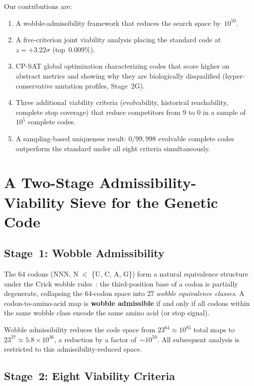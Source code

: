 \documentclass[10pt,twocolumn]{article}
\begin{document}
Our contributions are:
\begin{enumerate}[leftmargin=1.2em,itemsep=0pt]
\item A wobble-admissibility framework that reduces the search space by~$10^{50}$.
\item A five-criterion joint viability analysis placing the standard code at
      $z = +3.22\sigma$ (top~0.009\%).
\item CP-SAT global optimization characterizing codes that score higher on
      abstract metrics and showing why they are biologically disqualified
      (hyper-conservative mutation profiles, Stage~2G).
\item Three additional viability criteria (evolvability, historical
      reachability, complete stop coverage) that reduce competitors from 9 to 0
      in a sample of~$10^5$ complete codes.
\item A sampling-based uniqueness result: $0/99{,}998$ evolvable complete
      codes outperform the standard under all eight criteria simultaneously.
\end{enumerate}

\section{A Two-Stage Admissibility-Viability Sieve for the Genetic Code}

\subsection{Stage~1: Wobble Admissibility}

The 64 codons (NNN, N $\in$ \{U, C, A, G\}) form a natural equivalence
structure under the Crick wobble rules~\cite{Crick1966}: the third-position
base of a codon is partially degenerate, collapsing the 64-codon space into
27 \emph{wobble equivalence classes}. A codon-to-amino-acid map is
\textbf{wobble admissible} if and only if all codons within the same wobble
class encode the same amino acid (or stop signal).

Wobble admissibility reduces the code space from $23^{64} \approx 10^{85}$
total maps to $23^{27} \approx 5.8 \times 10^{36}$, a reduction by a factor
of~$\sim\!10^{50}$. All subsequent analysis is restricted to this
admissibility-reduced space.

\subsection{Stage~2: Eight Viability Criteria}
\end{document}

